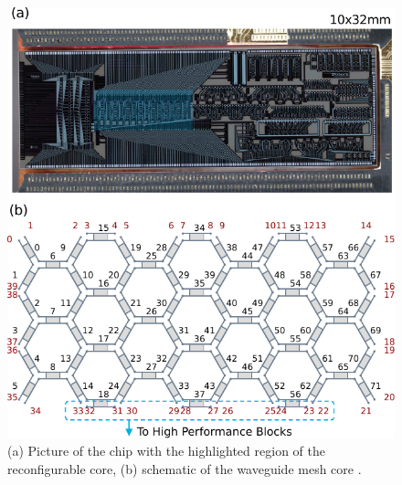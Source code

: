 \begin{figure}[h]
	\begin{center}
		\includegraphics{figures/ch2-sw-smart-mesh.pdf}
	\end{center}
	\caption{(a) Picture of the chip with the highlighted region of the reconfigurable core, (b) schematic of the waveguide mesh core \cite{perez-lopez_general-purpose_2024}.}
	\label{fig:ch2-smart-mesh}
\end{figure}

